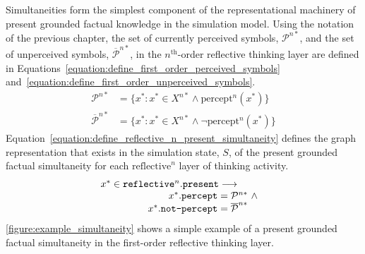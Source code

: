 Simultaneities form the simplest component of the representational
machinery of present grounded factual knowledge in the simulation
model.  Using the notation of the previous chapter, the set of
currently perceived symbols, $\mathcal{P}^{n*}$, and the set of
unperceived symbols, $\overline{\mathcal{P}}^{n*}$, in the
$n^{\text{th}}$-order reflective thinking layer are defined in
{\mbox{Equations~\ref{equation:define_first_order_perceived_symbols}}}
{\mbox{and~\ref{equation:define_first_order_unperceived_symbols}}}.
\begin{align}
\label{equation:define_first_order_perceived_symbols}
           \mathcal{P}^{n*} &= \{x^* : x^* \in X^{n*} \wedge \text{percept}^n(x^*)\} \\
\label{equation:define_first_order_unperceived_symbols}
\overline{\mathcal{P}}^{n*} &= \{x^* : x^* \in X^{n*} \wedge \neg\text{percept}^n(x^*)\}
\end{align}
{\mbox{Equation~\ref{equation:define_reflective_n_present_simultaneity}}}
defines the graph representation that exists in the simulation state,
$S$, of the present grounded factual simultaneity for each
$\text{reflective}^n$ layer of thinking activity.
\begin{equation}
\label{equation:define_reflective_n_present_simultaneity}
\begin{array}{l}
 x^* \in \text{\tt{reflective}}^n.\text{\tt{present}} \longrightarrow \\
\begin{array}{l}
\text{\makebox[4cm][r]{    $x^*.\text{\tt{percept}}$}}= \mathcal{P}^{n*} ~\wedge~ \\
\text{\makebox[4cm][r]{$x^*.\text{\tt{not-percept}}$}}= \overline{\mathcal{P}}^{n*}
\end{array}
\end{array}
\end{equation}
{\mbox{\autoref{figure:example_simultaneity}}} shows a simple example
of a present grounded factual simultaneity in the first-order
reflective thinking layer.
